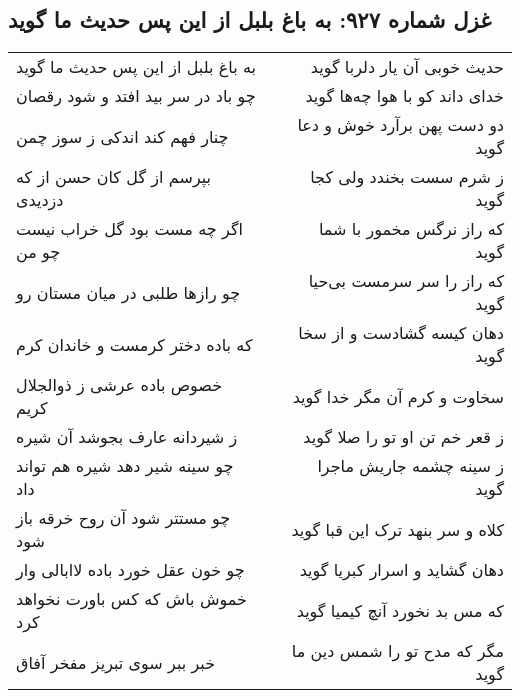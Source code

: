 \begin{center}
\section*{غزل شماره ۹۲۷: به باغ بلبل از این پس حدیث ما گوید}
\label{sec:0927}
\begin{longtable}{l p{0.5cm} r}
به باغ بلبل از این پس حدیث ما گوید
&&
حدیث خوبی آن یار دلربا گوید
\\
چو باد در سر بید افتد و شود رقصان
&&
خدای داند کو با هوا چه‌ها گوید
\\
چنار فهم کند اندکی ز سوز چمن
&&
دو دست پهن برآرد خوش و دعا گوید
\\
بپرسم از گل کان حسن از که دزدیدی
&&
ز شرم سست بخندد ولی کجا گوید
\\
اگر چه مست بود گل خراب نیست چو من
&&
که راز نرگس مخمور با شما گوید
\\
چو رازها طلبی در میان مستان رو
&&
که راز را سر سرمست بی‌حیا گوید
\\
که باده دختر کرمست و خاندان کرم
&&
دهان کیسه گشادست و از سخا گوید
\\
خصوص باده عرشی ز ذوالجلال کریم
&&
سخاوت و کرم آن مگر خدا گوید
\\
ز شیردانه عارف بجوشد آن شیره
&&
ز قعر خم تن او تو را صلا گوید
\\
چو سینه شیر دهد شیره هم تواند داد
&&
ز سینه چشمه جاریش ماجرا گوید
\\
چو مستتر شود آن روح خرقه باز شود
&&
کلاه و سر بنهد ترک این قبا گوید
\\
چو خون عقل خورد باده لاابالی وار
&&
دهان گشاید و اسرار کبریا گوید
\\
خموش باش که کس باورت نخواهد کرد
&&
که مس بد نخورد آنچ کیمیا گوید
\\
خبر ببر سوی تبریز مفخر آفاق
&&
مگر که مدح تو را شمس دین ما گوید
\\
\end{longtable}
\end{center}
